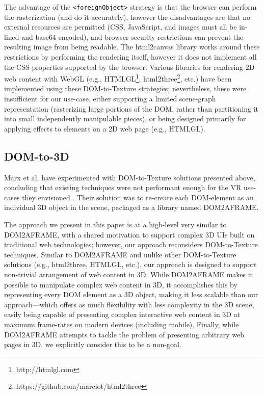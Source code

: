 \documentclass[sigconf]{acmart}
\begin{document}
The advantage of the \verb|<foreignObject>| strategy is that the browser can perform the rasterization (and do it accurately), however the disadvantages are that no external resources are permitted (CSS, JavaScript, and images must all be in-lined and base64 encoded), and browser security restrictions can prevent the resulting image from being readable. The html2canvas library works around these restrictions by performing the rendering itself, however it does not implement all the CSS properties supported by the browser. Various libraries for rendering 2D web content with WebGL (e.g., HTMLGL\footnote{http://htmlgl.com}, html2three\footnote{https://github.com/marciot/html2three}, etc.) have been implemented using these DOM-to-Texture strategies; nevertheless, these were insufficient for our use-case, either supporting a limited scene-graph representation (rasterizing large portions of the DOM, rather than partitioning it into small independently manipulable pieces), or being designed primarily for applying effects to elements on a 2D web page (e.g., HTMLGL).

\subsection{DOM-to-3D}

Marx et al. have experimented with DOM-to-Texture solutions presented above, concluding that existing techniques were not performant enough for the VR use-cases they envisioned \cite{Marx2017DOM2AFRAME:WebVR}. Their solution was to re-create each DOM-element as an individual 3D object in the scene, packaged as a library named DOM2AFRAME.

The approach we present in this paper is at a high-level very similar to DOM2AFRAME, with a shared motivation to support complex 3D UIs built on traditional web technologies; however, our approach reconsiders DOM-to-Texture techniques. Similar to DOM2AFRAME and unlike other DOM-to-Texture solutions (e.g., html2three, HTMLGL, etc.), our approach is designed to support non-trivial arrangement of web content in 3D. While DOM2AFRAME makes it possible to manipulate complex web content in 3D, it accomplishes this by representing every DOM element as a 3D object, making it less scalable than our approach---which offers as much flexibility with less complexity in the 3D scene, easily being capable of presenting complex interactive web content in 3D at maximum frame-rates on modern devices (including mobile). Finally, while DOM2AFRAME attempts to tackle the problem of presenting arbitrary web pages in 3D, we explicitly consider this to be a non-goal. 
\end{document}
